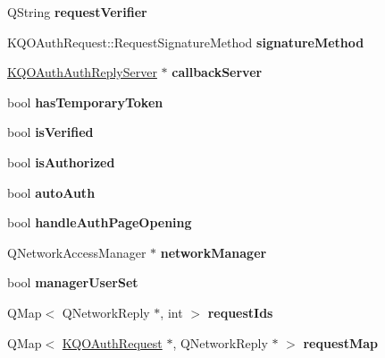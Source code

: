 \begin{DoxyCompactItemize}
\item 
\mbox{\label{class_k_q_o_auth_manager_private_a4a228366c3a3fc298deca15551191e8a}} 
Q\+String {\bfseries request\+Verifier}
\item 
\mbox{\label{class_k_q_o_auth_manager_private_ae82521ca23c14491a3bc8673ec73675a}} 
K\+Q\+O\+Auth\+Request\+::\+Request\+Signature\+Method {\bfseries signature\+Method}
\item 
\mbox{\label{class_k_q_o_auth_manager_private_ae68f0f0870906423856b1b03f4f9f912}} 
\hyperlink{class_k_q_o_auth_auth_reply_server}{K\+Q\+O\+Auth\+Auth\+Reply\+Server} $\ast$ {\bfseries callback\+Server}
\item 
\mbox{\label{class_k_q_o_auth_manager_private_a041aaae548a61c2d5796bde60634c497}} 
bool {\bfseries has\+Temporary\+Token}
\item 
\mbox{\label{class_k_q_o_auth_manager_private_a19c7463006c1d55032e101a1f7c60f2a}} 
bool {\bfseries is\+Verified}
\item 
\mbox{\label{class_k_q_o_auth_manager_private_a06eaaacecc25003b35225c20415786da}} 
bool {\bfseries is\+Authorized}
\item 
\mbox{\label{class_k_q_o_auth_manager_private_aa269afc61217f8e26fbd54cda8706c4f}} 
bool {\bfseries auto\+Auth}
\item 
\mbox{\label{class_k_q_o_auth_manager_private_a6088d9dce4df2b3387caad45a93c729d}} 
bool {\bfseries handle\+Auth\+Page\+Opening}
\item 
\mbox{\label{class_k_q_o_auth_manager_private_a85863307b4fb413835507f243118b32a}} 
Q\+Network\+Access\+Manager $\ast$ {\bfseries network\+Manager}
\item 
\mbox{\label{class_k_q_o_auth_manager_private_a3b202496ecf360017b868f26a9afd153}} 
bool {\bfseries manager\+User\+Set}
\item 
\mbox{\label{class_k_q_o_auth_manager_private_a9cc06185832303f30c6aab7a099bf4e5}} 
Q\+Map$<$ Q\+Network\+Reply $\ast$, int $>$ {\bfseries request\+Ids}
\item 
\mbox{\label{class_k_q_o_auth_manager_private_aa28557ccb6788d9e23a5c55220a7646c}} 
Q\+Map$<$ \hyperlink{class_k_q_o_auth_request}{K\+Q\+O\+Auth\+Request} $\ast$, Q\+Network\+Reply $\ast$ $>$ {\bfseries request\+Map}
\end{DoxyCompactItemize}


